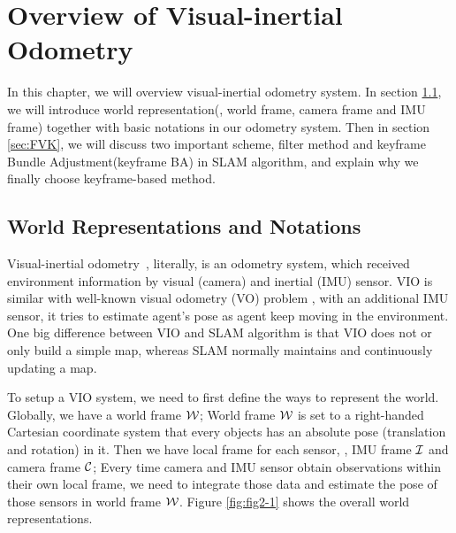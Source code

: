 \chapter{Overview of Visual-inertial Odometry}
\label{chap:Overview}

In this chapter, we will overview visual-inertial odometry system. In section
\ref{sec:notations}, we will introduce world representation(\eg, world frame,
camera frame and IMU frame) together with basic notations in our odometry system. 
Then in section \ref{sec:FVK}, 
we will discuss two important scheme, filter method and keyframe Bundle 
Adjustment(keyframe BA) in SLAM algorithm, and explain why we finally choose
keyframe-based method.

\section{World Representations and Notations}
\label{sec:notations}

Visual-inertial odometry~\cite{li2011consistency}, literally, is an odometry
system, which received
environment information by visual (camera) and inertial (IMU) sensor.
VIO is similar with well-known visual odometry (VO) problem \cite{nister2004visual},
with an additional IMU sensor, it tries to estimate agent's pose as agent keep moving
in the environment. One big difference between VIO and SLAM algorithm is that VIO
does not or only build a simple map, whereas SLAM normally maintains and continuously
updating a map.

To setup a VIO system, we need to first define the ways to represent the world. Globally,
we have a world frame $\mathcal{W}$; World frame $\mathcal{W}$ is set to a right-handed Cartesian 
coordinate system that every objects has an absolute pose (translation and rotation) in
it. Then we have local frame for each sensor, \ie, IMU frame $\mathcal{I}$ and camera frame $\mathcal{C}$;
Every time camera and IMU sensor obtain observations within their own local frame, we
need to integrate those data and estimate the pose of those sensors in world frame $\mathcal{W}$.
Figure \ref{fig:fig2-1} shows the overall world representations. 

